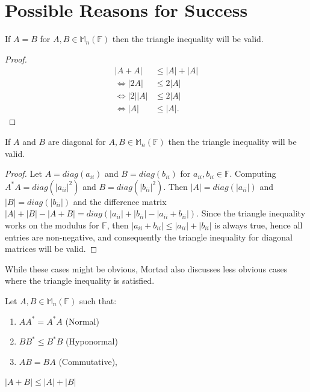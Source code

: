 \section{Possible Reasons for Success}
\begin{proposition}
    If \(A = B\) for \(A, B \in \mathbb{M}_n(\mathbb{F})\) then the triangle inequality will be valid.
\end{proposition}
\begin{proof}
   \begin{align*}
        |A+A| &\leq |A|+|A|\\
        \Leftrightarrow |2A| &\leq 2|A|\\
        \Leftrightarrow |2||A| &\leq 2|A|\\
        \Leftrightarrow |A| &\leq |A|.
    \end{align*} 
\end{proof}
\begin{proposition}
    If \(A\) and \(B\) are diagonal for \(A, B \in \mathbb{M}_n(\mathbb{F})\) then the triangle inequality will be valid.
\end{proposition}
\begin{proof}
    Let \(A = diag\left(a_{ii}\right)\) and \(B = diag\left(b_{ii}\right)\) for \(a_{ii}, b_{ii} \in \mathbb{F}\). Computing \(A^*A = diag\left(|a_{ii}|^2\right)\) and \(B = diag\left(|b_{ii}|^2\right)\). 
    Then \(|A| =  diag\left(|a_{ii}|\right)\) and \(|B| =  diag\left(|b_{ii}|\right)\) and the difference matrix 
    \(|A| + |B| - |A+B| = diag\left(|a_{ii}| + |b_{ii}| - |a_{ii} + b_{ii}| \right) \). Since the triangle inequality works on the modulus for \(\mathbb{F}\), then \( |a_{ii} + b_{ii}| \leq |a_{ii}| + |b_{ii}|\) is always true, hence
    all entries are non-negative, and consequently the triangle inequality for diagonal matrices will be valid.
\end{proof}
While these cases might be obvious, Mortad also discusses less obvious cases where the triangle inequality is satisfied.
\begin{theorem} %
    \label{theorem2}
    Let $A, B \in \mathbb{M}_n(\mathbb{F})$ such that:
    \begin{enumerate}
        \item $AA^* = A^*A$ (Normal)
        \item $BB^* \leq B^*B$ (Hyponormal)
        \item $AB = BA$ (Commutative), 
    \end{enumerate}
     $|A+B| \leq |A|+|B|$
\end{theorem}

